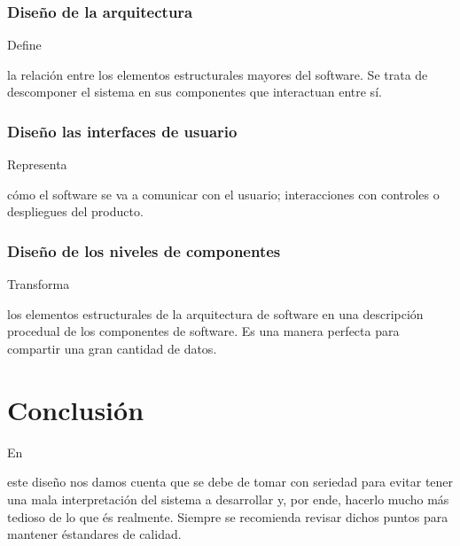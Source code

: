 \documentclass[stu, 12pt, letterpaper, donotrepeattitle, floatsintext, natbib]{apa7}
\begin{document}
\subsubsection{Diseño de la arquitectura}
Define \begin{justifying}
    la relación entre los elementos estructurales mayores del software. Se trata de descomponer el sistema
    en sus componentes que interactuan entre sí.\par
\end{justifying}
\subsubsection{Diseño las interfaces de usuario}
Representa \begin{justifying}
    cómo el software se va a comunicar con el usuario; interacciones con controles o despliegues del producto.\par
\end{justifying}
\subsubsection{Diseño de los niveles de componentes}
Transforma \begin{justifying}
    los elementos estructurales de la arquitectura de software en una descripción procedual de los componentes de software. Es una manera perfecta
    para compartir una gran cantidad de datos.\par
\end{justifying}
\vspace{\baselineskip}
\section{Conclusión}
En \begin{justifying}
    este diseño nos damos cuenta que se debe de tomar con seriedad para evitar tener una mala interpretación del sistema a desarrollar y, por ende, hacerlo mucho más tedioso
    de lo que és realmente. Siempre se recomienda revisar dichos puntos para mantener éstandares de calidad.\par
\end{justifying}

\setcounter{secnumdepth}{0} %
\renewcommand\refname{\textbf{Referencias}}

\end{document}
